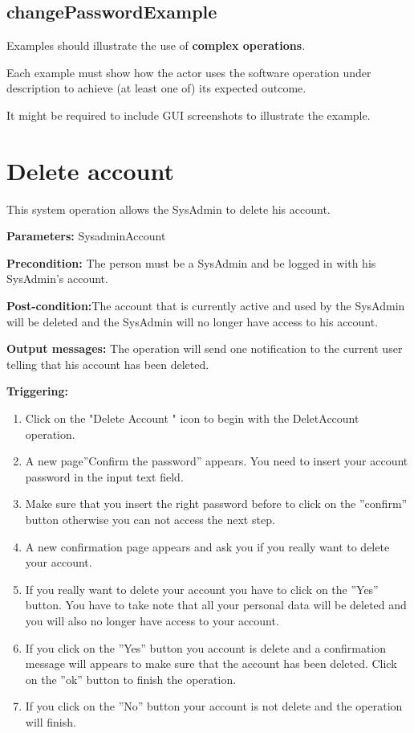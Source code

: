  
\subsection{changePasswordExample}
Examples should illustrate the use of \textbf{complex operations}.

Each example must show how the actor uses the software operation under
description to achieve (at least one of) its expected outcome.

It might be required to include GUI screenshots to illustrate the example.




\section{Delete account}
\label{operation:deletAccount}
This system operation allows the SysAdmin to delete his account.

\begin{description}

\item \textbf{Parameters:} SysadminAccount
\item \textbf{Precondition:} The person must be a SysAdmin and be logged in with
his SysAdmin's account.
\item \textbf{Post-condition:}The account that is currently active and used by
the SysAdmin will be deleted and the SysAdmin will no longer have access to his
account.
\item \textbf{Output messages:} The operation will send one notification to the
current user telling that his account has been deleted.


\item \textbf{Triggering:}
\begin{enumerate}
\item Click on the "Delete Account " icon to begin with the DeletAccount
operation.
\item A new page''Confirm the password'' appears. You need to insert your
account password in the input text field. 
\item Make sure that you insert the right password before to click on the
''confirm'' button otherwise you can not access the next step.
\item A new confirmation page appears and ask you if you really want to delete
your account.
\item If you really want to delete your account you have to click on the
''Yes'' button. You have to take note that all your personal data will be
deleted and you will also no longer have access to your account.
\item If you click on the ''Yes'' button you account is delete and a
confirmation message will appears to make sure that the account has been
deleted. Click on the ''ok'' button to finish the operation.
\item If you click on the ''No'' button your account is not delete and the
operation will finish.
\end{enumerate}

 
\end{description}

